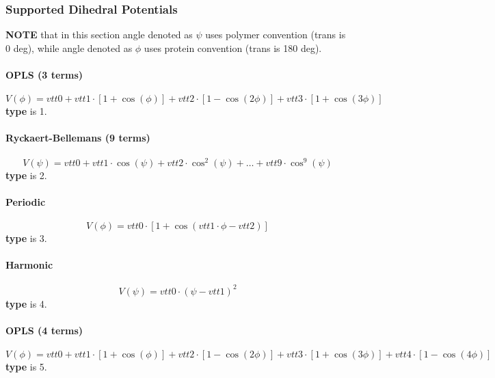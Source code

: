 \documentclass[12pt,letterpaper]{article}
\begin{document}
\subsubsection{Supported Dihedral Potentials}
\label{torsion}
{\bf NOTE} that in this section angle denoted as $\psi$ uses
polymer convention (trans is 0 deg), while angle denoted as
$\phi$ uses protein convention (trans is 180 deg).

\paragraph{OPLS (3 terms)}
\begin{equation}
V(\phi) = vtt0 + vtt1\cdot[1+\cos(\phi)] + vtt2\cdot[1-\cos(2\phi)]
+ vtt3\cdot[1+\cos(3\phi)]
\end{equation}
{\bf type} is 1.

\paragraph{Ryckaert-Bellemans (9 terms)}
\begin{equation}
V(\psi) = vtt0 + vtt1\cdot\cos(\psi) + vtt2\cdot\cos^2(\psi) + \dots + vtt9\cdot\cos^9(\psi)
\end{equation}
{\bf type} is 2.

\paragraph{Periodic}
\begin{equation}
V(\phi) = vtt0\cdot[1+\cos(vtt1\cdot\phi-vtt2)]
\end{equation}
{\bf type} is 3.

\paragraph{Harmonic}
\begin{equation}
V(\psi) = vtt0\cdot(\psi-vtt1)^2
\end{equation}
{\bf type} is 4.

\paragraph{OPLS (4 terms)}
\begin{equation}
V(\phi) = vtt0 + vtt1\cdot[1+\cos(\phi)] + vtt2\cdot[1-\cos(2\phi)]
+ vtt3\cdot[1+\cos(3\phi)] + vtt4\cdot[1-\cos(4\phi)]
\end{equation}
{\bf type} is 5.
\end{document}

